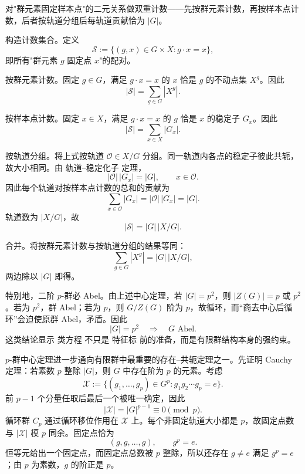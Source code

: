 对"群元素固定样本点"的二元关系做双重计数——先按群元素计数，再按样本点计数，后者按轨道分组后每轨道贡献恰为 $|G|$。

构造计数集合。定义
\begin{equation*}
 \mathcal S
 :=\{(g,x)\in G\times X:g\cdot x=x\},
\end{equation*}
即所有"群元素 $g$ 固定点 $x$"的配对。

按群元素计数。固定 $g\in G$，满足 $g\cdot x=x$ 的 $x$ 恰是 $g$ 的不动点集 $X^g$。因此
\begin{equation*}
 |\mathcal S|
 =\sum_{g\in G}|X^g|.
\end{equation*}

按样本点计数。固定 $x\in X$，满足 $g\cdot x=x$ 的 $g$ 恰是 $x$ 的稳定子 $G_x$。因此
\begin{equation*}
 |\mathcal S|
 =\sum_{x\in X}|G_x|.
\end{equation*}

按轨道分组。将上式按轨道 $\mathcal O\in X/G$ 分组。同一轨道内各点的稳定子彼此共轭，故大小相同。由 轨道--稳定化子 定理，
\begin{equation*}
 |\mathcal O|\,|G_x|=|G|,
 \qquad x\in\mathcal O.
\end{equation*}
因此每个轨道对按样本点计数的总和的贡献为
\begin{equation*}
 \sum_{x\in\mathcal O}|G_x|
 =|\mathcal O|\,|G_x|
 =|G|.
\end{equation*}
轨道数为 $|X/G|$，故
\begin{equation*}
 |\mathcal S|=|G|\,|X/G|.
\end{equation*}

合并。将按群元素计数与按轨道分组的结果等同：
\begin{equation*}
 \sum_{g\in G}|X^g|=|G|\,|X/G|,
\end{equation*}
两边除以 $|G|$ 即得。

特别地，二阶 $p$-群必 Abel。由上述中心定理，若 $|G|=p^2$，则 $|Z(G)|=p$ 或 $p^2$。若为 $p^2$，群 Abel；若为 $p$，则 $G/Z(G)$ 阶为 $p$，故循环，而“商去中心后循环”会迫使原群 Abel，矛盾。因此
\[
\boxed{|G|=p^2\quad\Longrightarrow\quad G\text{ Abel}.}
\]
这类结论显示 类方程 不只是 特征标 前的准备，而是有限群结构本身的强约束。

$p$-群中心定理进一步通向有限群中最重要的存在--共轭定理之一。先证明 Cauchy 定理：若素数 $p$ 整除 $|G|$，则 $G$ 中存在阶为 $p$ 的元素。考虑
\[
\mathcal X:=\{(g_1,\ldots,g_p)\in G^p:g_1g_2\cdots g_p=e\}.
\]
前 $p-1$ 个分量任取后最后一个被唯一确定，因此
\[
|\mathcal X|=|G|^{p-1}\equiv0\pmod p.
\]
循环群 $C_p$ 通过循环移位作用在 $\mathcal X$ 上。每个非固定轨道大小都是 $p$，故固定点数与 $|\mathcal X|$ 模 $p$ 同余。固定点恰为
\[
(g,g,\ldots,g),\qquad g^p=e.
\]
恒等元给出一个固定点，而固定点总数被 $p$ 整除，所以还存在 $g\neq e$ 满足 $g^p=e$；由 $p$ 为素数，$g$ 的阶正是 $p$。

